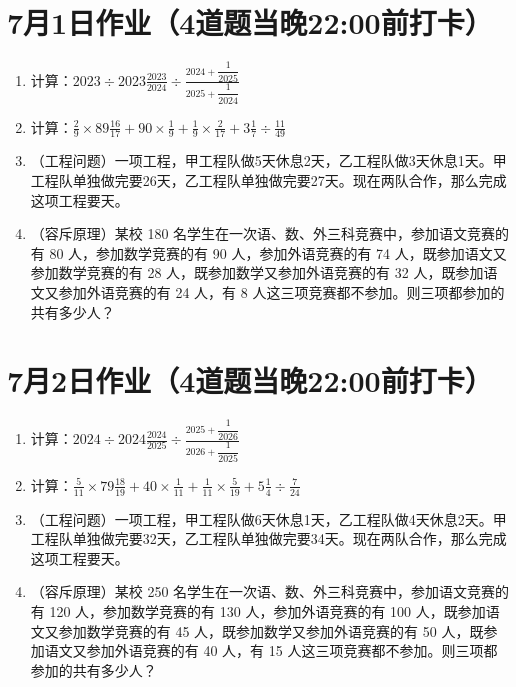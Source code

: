 \documentclass[UTF8,12pt,a4paper]{ctexart}
\newcommand{\BottomWriteSpace}{2.5cm}
\newenvironment{OnePageFourFill}{
  \small
  \vspace*{0pt}
  \begin{enumerate}[leftmargin=*, itemsep=0pt, topsep=0pt, parsep=0pt, partopsep=0pt]
  \setlength{\parskip}{0pt}
}{
  \end{enumerate}
  \vspace*{\BottomWriteSpace}
  \normalsize
  \newpage
}
\newcommand{\Q}[1]{\item #1\par\vfill}
\newcommand{\Qlast}[1]{\item #1\par}
\begin{document}
\section*{7月1日作业（4道题当晚22:00前打卡）}
\begin{OnePageFourFill}

\Q{计算：$\displaystyle 2023 \div 2023\frac{2023}{2024} \div \frac{2024 + \dfrac{1}{2025}}{2025 + \dfrac{1}{2024}}$}

\Q{计算：$\displaystyle \frac{2}{9} \times 89\frac{16}{17} + 90 \times \frac{1}{9} + \frac{1}{9} \times \frac{2}{17} + 3\frac{1}{7} \div \frac{11}{49}$}

\Q{（工程问题）一项工程，甲工程队做5天休息2天，乙工程队做3天休息1天。甲工程队单独做完要26天，乙工程队单独做完要27天。现在两队合作，那么完成这项工程要\underline{\hspace{3em}}天。}

\Qlast{（容斥原理）某校 180 名学生在一次语、数、外三科竞赛中，参加语文竞赛的有 80 人，参加数学竞赛的有 90 人，参加外语竞赛的有 74 人，既参加语文又参加数学竞赛的有 28 人，既参加数学又参加外语竞赛的有 32 人，既参加语文又参加外语竞赛的有 24 人，有 8 人这三项竞赛都不参加。则三项都参加的共有多少人？}

\end{OnePageFourFill}

\section*{7月2日作业（4道题当晚22:00前打卡）}
\begin{OnePageFourFill}

\Q{计算：$\displaystyle 2024 \div 2024\frac{2024}{2025} \div \frac{2025 + \dfrac{1}{2026}}{2026 + \dfrac{1}{2025}}$}

\Q{计算：$\displaystyle \frac{5}{11} \times 79\frac{18}{19} + 40 \times \frac{1}{11} + \frac{1}{11} \times \frac{5}{19} + 5\frac{1}{4} \div \frac{7}{24}$}

\Q{（工程问题）一项工程，甲工程队做6天休息1天，乙工程队做4天休息2天。甲工程队单独做完要32天，乙工程队单独做完要34天。现在两队合作，那么完成这项工程要\underline{\hspace{3em}}天。}

\Qlast{（容斥原理）某校 250 名学生在一次语、数、外三科竞赛中，参加语文竞赛的有 120 人，参加数学竞赛的有 130 人，参加外语竞赛的有 100 人，既参加语文又参加数学竞赛的有 45 人，既参加数学又参加外语竞赛的有 50 人，既参加语文又参加外语竞赛的有 40 人，有 15 人这三项竞赛都不参加。则三项都参加的共有多少人？}

\end{OnePageFourFill}
\end{document}
